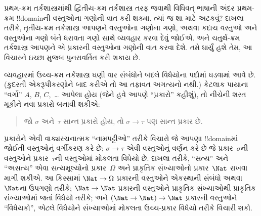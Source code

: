 \documentclass[../../../include/open-logic-section]{subfiles}
\begin{document}


પ્રથમ-ક્રમ તર્કશાસ્ત્રમાંથી દ્વિતીય-ક્રમ તર્કશાસ્ત્ર તરફ જવાથી વિધિવત્
ભાષાની અંદર પ્રથમ-ક્રમ !!{domain}ની વસ્તુઓના ગણોની વાત કરી શક્યા.
ત્યાં જ શા માટે અટકવું? દાખલા તરીકે, તૃતીય-ક્રમ તર્કશાસ્ત્ર આપણને
વસ્તુઓના ગણોના ગણો, અથવા કદાચ વસ્તુઓ અને વસ્તુઓના ગણો બંને ધરાવતા ગણો
સાથે વ્યવહાર કરવા દેવું જોઈએ. અને ચતુર્થ-ક્રમ તર્કશાસ્ત્ર આપણને એ
પ્રકારની વસ્તુઓના ગણોની વાત કરવા દેશે. તમે ધાર્યું હશે તેમ, આ વિચારને
ઇચ્છા મુજબ પુનરાવર્તિત કરી શકાય છે.

વ્યવહારમાં ઉચ્ચ-ક્રમ તર્કશાસ્ત્ર ઘણી વાર સંબંધોને બદલે વિધેયોના પદોમાં
ઘડવામાં આવે છે. (કુદરતી એકરૂપીકરણોને બાદ કરીએ તો આ
તફાવત અગત્યનો નથી.) કેટલાક પાયાના ``વર્ગો'' $A$, $B$, $C$,~\dots
આપેલા હોય (જેને હવે આપણે ``પ્રકારો'' કહીશું), તો નીચેની શરત મૂકીને
નવા પ્રકારો બનાવી શકીએ:
\begin{quote}
જો $\sigma$ અને~$\tau$ સાન્ત પ્રકારો હોય, તો $\sigma \to \tau$ પણ
સાન્ત પ્રકાર છે.
\end{quote}

પ્રકારોને એવી વાક્યરચનાત્મક ``નામપટ્ટીઓ'' તરીકે વિચારો જે આપણા
!!{domain}માં જોઈતી વસ્તુઓનું વર્ગીકરણ કરે છે; $\sigma \to \tau$ એવી
વસ્તુઓનું વર્ણન કરે છે જે પ્રકાર~$\sigma$ની વસ્તુઓને પ્રકાર~$\tau$ની
વસ્તુઓમાં મોકલતા વિધેયો છે. દાખલા તરીકે, ``સત્ય'' અને ``અસત્ય'' એવા
સત્યમૂલ્યોનો પ્રકાર~$\Omega$ અને પ્રાકૃતિક સંખ્યાઓનો પ્રકાર~$\Nat$
રાખવા માગી શકીએ. આ કિસ્સામાં $\Nat \to \Omega$ પ્રકારની વસ્તુઓને
એકસ્થાની સંબંધો અથવા~$\Nat$ના ઉપગણો તરીકે; $\Nat \to \Nat$ પ્રકારની
વસ્તુઓને પ્રાકૃતિક સંખ્યાઓથી પ્રાકૃતિક સંખ્યાઓમાં જતાં વિધેયો તરીકે;
અને $(\Nat \to \Nat) \to \Nat$ પ્રકારની વસ્તુઓને ``વિધેયકો'', એટલે
વિધેયોને સંખ્યાઓમાં મોકલતા ઉચ્ચ-પ્રકાર વિધેયો તરીકે વિચારી શકો.
\end{document}
